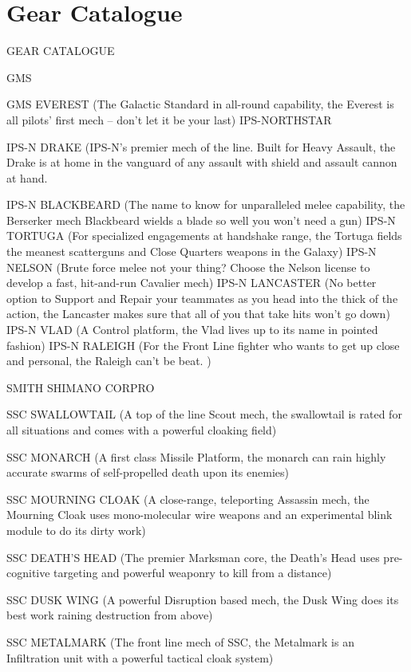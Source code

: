 \chapter{Gear Catalogue}
 GEAR CATALOGUE

                                                GMS

GMS EVEREST (The Galactic Standard in all-round capability, the Everest is all pilots’ first mech
-- don’t let it be your last)
                                    IPS-NORTHSTAR

IPS-N DRAKE (IPS-N’s premier mech of the line. Built for Heavy Assault, the Drake is at home
in the vanguard of any assault with shield and assault cannon at hand.

IPS-N BLACKBEARD (The name to know for unparalleled melee capability, the Berserker mech
Blackbeard wields a blade so well you won’t need a gun)
IPS-N TORTUGA (For specialized engagements at handshake range, the Tortuga fields the
meanest scatterguns and Close Quarters weapons in the Galaxy)
IPS-N NELSON (Brute force melee not your thing? Choose the Nelson license to develop a fast,
hit-and-run Cavalier mech)
IPS-N LANCASTER (No better option to Support and Repair your teammates as you head into
the thick of the action, the Lancaster makes sure that all of you that take hits won’t go down)
IPS-N VLAD (A Control platform, the Vlad lives up to its name in pointed fashion)
IPS-N RALEIGH (For the Front Line fighter who wants to get up close and personal, the Raleigh
can’t be beat. )

                           SMITH SHIMANO CORPRO

SSC SWALLOWTAIL (A top of the line Scout mech, the swallowtail is rated for all situations and
comes with a powerful cloaking field)

SSC MONARCH (A first class Missile Platform, the monarch can rain highly accurate swarms of
self-propelled death upon its enemies)

SSC MOURNING CLOAK (A close-range, teleporting Assassin mech, the Mourning Cloak uses
mono-molecular wire weapons and an experimental blink module to do its dirty work)

SSC DEATH’S HEAD (The premier Marksman core, the Death’s Head uses pre-cognitive
targeting and powerful weaponry to kill from a distance)

SSC DUSK WING (A powerful Disruption based mech, the Dusk Wing does its best work
raining destruction from above)

SSC METALMARK (The front line mech of SSC, the Metalmark is an Infiltration unit with a
powerful tactical cloak system)

